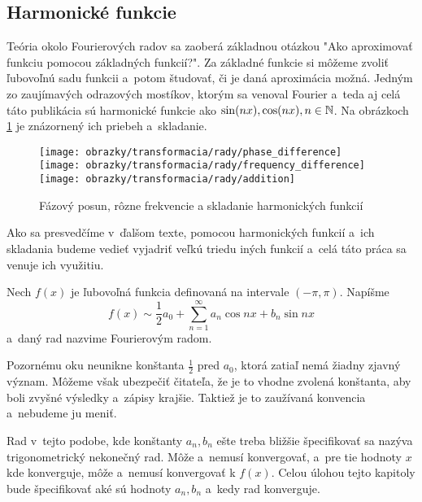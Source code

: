 \subsection{Harmonické funkcie}

Teória okolo Fourierových radov sa zaoberá základnou otázkou "Ako
aproximovať funkciu pomocou základných funkcií?".
Za základné funkcie si môžeme zvoliť ľubovoľnú sadu funkcii a~potom
študovať, či je daná aproximácia možná. Jedným zo zaujímavých
odrazových mostíkov, ktorým sa venoval Fourier a~teda aj celá táto
publikácia sú harmonické funkcie ako $\sin(n x), \cos(nx), n \in \mathbb{N}$.
Na obrázkoch \ref{fig:harmonic_illustration} je znázornený 
ich priebeh a~skladanie.

\begin{figure}[htp]
    \centering
    \texttt{[image: obrazky/transformacia/rady/phase\_difference]}
    \texttt{[image: obrazky/transformacia/rady/frequency\_difference]}
    \texttt{[image: obrazky/transformacia/rady/addition]}
    \caption{Fázový posun, rôzne frekvencie a skladanie harmonických
    funkcií}\label{fig:harmonic_illustration}
\end{figure}

Ako sa presvedčíme v~ďalšom texte, pomocou harmonických funkcií a~ich
skladania budeme vedieť vyjadriť veľkú triedu iných funkcií a~celá
táto práca sa venuje ich využitiu.

\begin{definicia} Nech $f(x)$ je ľubovoľná funkcia definovaná na
intervale $(-\pi,\pi)$. Napíšme
    \begin{equation}
        f(x) \sim \frac{1}{2} a_0 + \sum_{n=1}^{\infty} a_n
        \cos n x + b_n \sin n x
    \label{eq:trig_series}
    \end{equation}
a~daný rad nazvime Fourierovým radom.
    \label{def:fourier_series}
\end{definicia}

\begin{poznamka}
    Pozornému oku neunikne konštanta $\frac{1}{2}$ pred $a_0$, ktorá
    zatiaľ nemá žiadny zjavný význam. Môžeme však ubezpečiť čitateľa,
    že je to vhodne zvolená konštanta, aby boli zvyšné výsledky 
    a~zápisy krajšie. Taktiež je to zaužívaná konvencia a~nebudeme
    ju meniť.
\end{poznamka}

Rad v~tejto podobe, kde konštanty $a_n, b_n$ ešte treba bližšie
špecifikovať sa nazýva trigonometrický nekonečný rad. Môže a~nemusí
konvergovať, a~pre tie hodnoty $x$ kde konverguje, môže a~nemusí
konvergovať k $f(x)$. Celou úlohou tejto kapitoly bude špecifikovať
aké sú hodnoty $a_n, b_n$ a~kedy rad konverguje.

